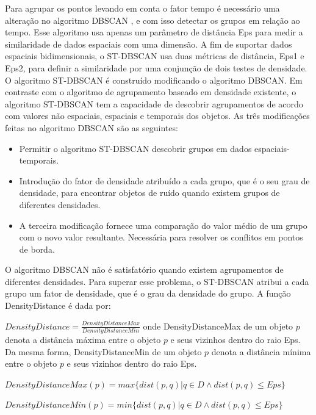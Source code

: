 Para agrupar os pontos levando em conta o fator tempo é necessário uma alteração no algoritmo \acrshort{DBSCAN} \cite{ESTER1998}, e com isso detectar os grupos em relação ao tempo. Esse algoritmo usa apenas um parâmetro de distância Eps para medir a similaridade de dados espaciais com uma dimensão. A fim de suportar dados espaciais bidimensionais, o \acrshort{ST-DBSCAN} \cite{Birant2007STDBSCANAA} usa duas métricas de distância, Eps1 e Eps2, para definir a similaridade por uma conjunção de dois testes de densidade.
O algoritmo \acrshort{ST-DBSCAN} é construído modificando o algoritmo \acrshort{DBSCAN}. Em contraste com o algoritmo de agrupamento baseado em densidade existente, o algoritmo \acrshort{ST-DBSCAN} tem a capacidade de descobrir agrupamentos de acordo com valores não espaciais, espaciais e temporais dos objetos. As três modificações feitas no algoritmo \acrshort{DBSCAN} são as seguintes:
\begin{itemize}
\item Permitir o algoritmo \acrshort{ST-DBSCAN} descobrir grupos em dados espaciais-temporais.
\item Introdução do fator de densidade atribuído a cada grupo, que é o seu grau de densidade, para encontrar objetos de ruído quando existem grupos de diferentes densidades.
\item A terceira modificação fornece uma comparação do valor médio de um grupo com o novo valor resultante. Necessária para resolver os conflitos em pontos de borda.
\end{itemize}

O algoritmo \acrshort{DBSCAN} não é satisfatório quando existem agrupamentos de diferentes densidades. Para superar esse problema, o \acrshort{ST-DBSCAN} atribui a cada grupo um fator de densidade, que é o grau da densidade do grupo.
A função DensityDistance é dada por:

${DensityDistance = \frac{DensityDistanceMax}{DensityDistanceMin}}$
\linebreak
onde DensityDistanceMax de um objeto ${p}$ denota a distância máxima entre o objeto ${p}$ e seus vizinhos dentro do raio Eps. Da mesma forma, DensityDistanceMin de um objeto ${p}$ denota a distância mínima entre o objeto ${p}$ e seus vizinhos dentro do raio Eps.

${DensityDistanceMax(p) = max\big\{ dist(p, q) | q \in D \wedge dist(p, q)  \leqslant Eps\big\} }$

${DensityDistanceMin(p) = min\big\{ dist(p, q) | q \in D \wedge dist(p, q)  \leqslant Eps\big\} }$
\linebreak

